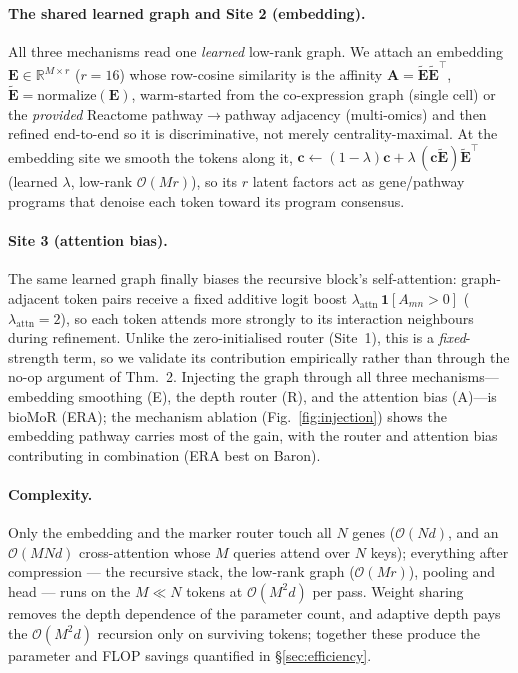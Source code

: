 \documentclass[letterpaper]{article}
\begin{document}
\paragraph{The shared learned graph and Site 2 (embedding).}
All three mechanisms read one \emph{learned} low-rank graph. We attach an embedding
$\mathbf{E}\in\mathbb{R}^{M\times r}$ ($r{=}16$) whose row-cosine similarity is the affinity
$\mathbf{A}=\tilde{\mathbf{E}}\tilde{\mathbf{E}}^{\top}$,
$\tilde{\mathbf{E}}=\mathrm{normalize}(\mathbf{E})$, warm-started from the co-expression graph
(single cell) or the \emph{provided} Reactome pathway$\to$pathway adjacency
(multi-omics) and then refined end-to-end so it is
discriminative, not merely centrality-maximal. At the embedding site we smooth the tokens
along it, $\mathbf{c}\leftarrow(1-\lambda)\mathbf{c}+\lambda\,(\mathbf{c}\tilde{\mathbf{E}})\tilde{\mathbf{E}}^{\top}$
(learned $\lambda$, low-rank $\mathcal{O}(Mr)$), so its $r$ latent factors act as gene/pathway
programs that denoise each token toward its program consensus.

\paragraph{Site 3 (attention bias).}
The same learned graph finally biases the recursive block's self-attention: graph-adjacent
token pairs receive a fixed additive logit boost
$\lambda_{\mathrm{attn}}\,\mathbf{1}[A_{mn}{>}0]$ ($\lambda_{\mathrm{attn}}{=}2$), so each token
attends more strongly to its interaction neighbours during refinement. Unlike the
zero-initialised router (Site~1), this is a \emph{fixed}-strength term, so we validate its
contribution empirically rather than through the no-op argument of Thm.~2. Injecting the graph
through all three mechanisms---embedding smoothing (E), the depth router (R), and the attention
bias (A)---is bioMoR (ERA); the mechanism ablation (Fig.~\ref{fig:injection}) shows the
embedding pathway carries most of the gain, with the router and attention bias contributing
in combination (ERA best on Baron).

\paragraph{Complexity.}
Only the embedding and the marker router touch all $N$ genes ($\mathcal{O}(Nd)$, and an
$\mathcal{O}(MNd)$ cross-attention whose $M$ queries attend over $N$ keys); everything after
compression --- the recursive stack, the low-rank graph ($\mathcal{O}(Mr)$), pooling and head ---
runs on the $M\ll N$ tokens at $\mathcal{O}(M^2 d)$ per pass. Weight sharing removes the depth
dependence of the parameter count, and adaptive depth pays the $\mathcal{O}(M^2 d)$ recursion only
on surviving tokens; together these produce the parameter and FLOP savings quantified in
\S\ref{sec:efficiency}.
\end{document}
